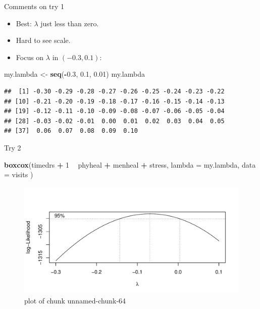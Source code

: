 \documentclass[ignorenonframetext,]{beamer}
\newenvironment{Shaded}{\begin{snugshade}}{\end{snugshade}}
\newcommand{\DataTypeTok}[1]{\textcolor[rgb]{0.13,0.29,0.53}{#1}}
\newcommand{\DecValTok}[1]{\textcolor[rgb]{0.00,0.00,0.81}{#1}}
\newcommand{\FloatTok}[1]{\textcolor[rgb]{0.00,0.00,0.81}{#1}}
\newcommand{\KeywordTok}[1]{\textcolor[rgb]{0.13,0.29,0.53}{\textbf{#1}}}
\newcommand{\NormalTok}[1]{#1}
\newcommand{\OperatorTok}[1]{\textcolor[rgb]{0.81,0.36,0.00}{\textbf{#1}}}
\newcommand{\StringTok}[1]{\textcolor[rgb]{0.31,0.60,0.02}{#1}}
\begin{document}
\begin{frame}[fragile]{Comments on try 1}
\protect\hypertarget{comments-on-try-1}{}

\begin{itemize}
\item
  Best: \(\lambda\) just less than zero.
\item
  Hard to see scale.
\item
  Focus on \(\lambda\) in \((-0.3,0.1)\):
\end{itemize}

\footnotesize

\begin{Shaded}
\begin{Highlighting}[]
\NormalTok{my.lambda <-}\StringTok{ }\KeywordTok{seq}\NormalTok{(}\OperatorTok{-}\FloatTok{0.3}\NormalTok{, }\FloatTok{0.1}\NormalTok{, }\FloatTok{0.01}\NormalTok{)}
\NormalTok{my.lambda}
\end{Highlighting}
\end{Shaded}

\begin{verbatim}
##  [1] -0.30 -0.29 -0.28 -0.27 -0.26 -0.25 -0.24 -0.23 -0.22
## [10] -0.21 -0.20 -0.19 -0.18 -0.17 -0.16 -0.15 -0.14 -0.13
## [19] -0.12 -0.11 -0.10 -0.09 -0.08 -0.07 -0.06 -0.05 -0.04
## [28] -0.03 -0.02 -0.01  0.00  0.01  0.02  0.03  0.04  0.05
## [37]  0.06  0.07  0.08  0.09  0.10
\end{verbatim}

\normalsize

\end{frame}

\begin{frame}[fragile]{Try 2}
\protect\hypertarget{try-2}{}

\begin{Shaded}
\begin{Highlighting}[]
\KeywordTok{boxcox}\NormalTok{(timedrs }\OperatorTok{+}\StringTok{ }\DecValTok{1} \OperatorTok{~}\StringTok{ }\NormalTok{phyheal }\OperatorTok{+}\StringTok{ }\NormalTok{menheal }\OperatorTok{+}\StringTok{ }\NormalTok{stress,}
  \DataTypeTok{lambda =}\NormalTok{ my.lambda,}
  \DataTypeTok{data =}\NormalTok{ visits}
\NormalTok{)}
\end{Highlighting}
\end{Shaded}

\begin{figure}
\centering
\includegraphics{figure/unnamed-chunk-64-1.pdf}
\caption{plot of chunk unnamed-chunk-64}
\end{figure}

\end{frame}
\end{document}
